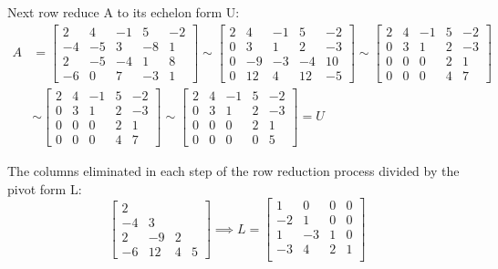 \documentclass[12pt]{article} %
\begin{document}
Next row reduce A to its echelon form U:
\begin{align*}
	A &= \begin{bmatrix}
		2 & 4 & -1 & 5 & -2\\
		-4 & -5 & 3 & -8 & 1\\
		2 & -5 & -4 & 1 & 8\\
		-6 & 0 & 7 & -3 & 1
	\end{bmatrix} \sim \begin{bmatrix}
		2 & 4 & -1 & 5 & -2\\
		0 & 3 & 1 & 2 & -3\\
		0 & -9 & -3 & -4 & 10\\
		0 & 12 & 4 & 12 & -5
	\end{bmatrix} \sim \begin{bmatrix}
		2 & 4 & -1 & 5 & -2\\
		0 & 3 & 1 & 2 & -3\\
		0 & 0 & 0 & 2 & 1\\
		0 & 0 & 0 & 4 & 7
	\end{bmatrix}\\ 
	&\sim \begin{bmatrix}
		2 & 4 & -1 & 5 & -2\\
		0 & 3 & 1 & 2 & -3\\
		0 & 0 & 0 & 2 & 1\\
		0 & 0 & 0 & 4 & 7
	\end{bmatrix} \sim \begin{bmatrix}
		2 & 4 & -1 & 5 & -2\\
		0 & 3 & 1 & 2 & -3\\
		0 & 0 & 0 & 2 & 1\\
		0 & 0 & 0 & 0 & 5
	\end{bmatrix} = U
\end{align*}

The columns eliminated in each step of the row reduction process divided by the pivot form L:
$$\begin{bmatrix}
	2 & & & \\
	-4 & 3 & & \\
	2 & -9 & 2 & \\
	-6 & 12 & 4 & 5
\end{bmatrix} \implies L = \begin{bmatrix}
	1 & 0 & 0 & 0\\
	-2 & 1 & 0 & 0\\
	1 & -3 & 1 & 0\\
	-3 & 4 & 2 & 1\\
\end{bmatrix}$$
\end{document}
